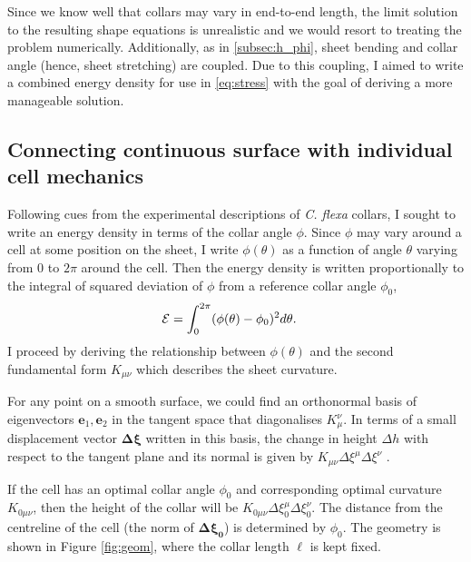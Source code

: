 Since we know well that collars may vary in end-to-end length, the limit solution to the resulting shape equations is unrealistic and we would resort to treating the problem numerically.
Additionally, as in \cref{subsec:h_phi}, sheet bending and collar angle (hence, sheet stretching) are coupled. 
Due to this coupling, I aimed to write a combined energy density for use in \cref{eq:stress} with the goal of deriving a more manageable solution.

\subsection{Connecting continuous surface with individual cell mechanics}

Following cues from the experimental descriptions of \textit{C. flexa} collars, I sought to write an energy density in terms of the collar angle $\phi$. 
Since $\phi$ may vary around a cell at some position on the sheet, I write $\phi(\theta)$ as a function of angle $\theta$ varying from $0$ to $2\pi$ around the cell.
Then the energy density is written proportionally to the integral of squared deviation of $\phi$ from a reference collar angle $\phi_0$,
\begin{align}
	\mathcal{E} &= \int_0^{2\pi} (\phi(\theta) - \phi_0)^2 d\theta. \label{eq:phi_int}
\end{align}
I proceed by deriving the relationship between $\phi(\theta)$ and the second fundamental form $K_{\mu\nu}$ which describes the sheet curvature.

For any point on a smooth surface, we could find an orthonormal basis of eigenvectors $\bm{e}_1, \bm{e}_2$ in the tangent space that diagonalises $K_\mu^\nu$. 
In terms of a small displacement vector $\bm{\Delta \xi}$ written in this basis, the change in height $\Delta h$ with respect to the tangent plane and its normal is given by $K_{\mu\nu}\Delta\xi^\mu\Delta\xi^\nu$ \citep{powers2010}.

If the cell has an optimal collar angle $\phi_0$ and corresponding optimal curvature $K_{0\mu\nu}$, then the height of the collar will be $K_{0\mu\nu}\Delta\xi_0^\mu\Delta\xi_0^\nu$. 
The distance from the centreline of the cell (the norm of $\bm{\Delta\xi_0}$) is determined by $\phi_0$. The geometry is shown in Figure \ref{fig:geom}, where the collar length $\ell$ is kept fixed.

